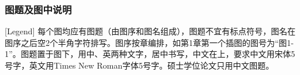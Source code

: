 











\subsubsection{图题及图中说明}[Legend]
每个图均应有图题（由图序和图名组成），图题不宜有标点符号，图名在图序之后空2个半角字符排写。图序按章编排，如第1章第一个插图的图号为“图1-1”。图题置于图下，用中、英两种文字，居中书写，中文在上，要求中文用宋体5号字，英文用Times New Roman字体5号字。硕士学位论文只用中文图题。

